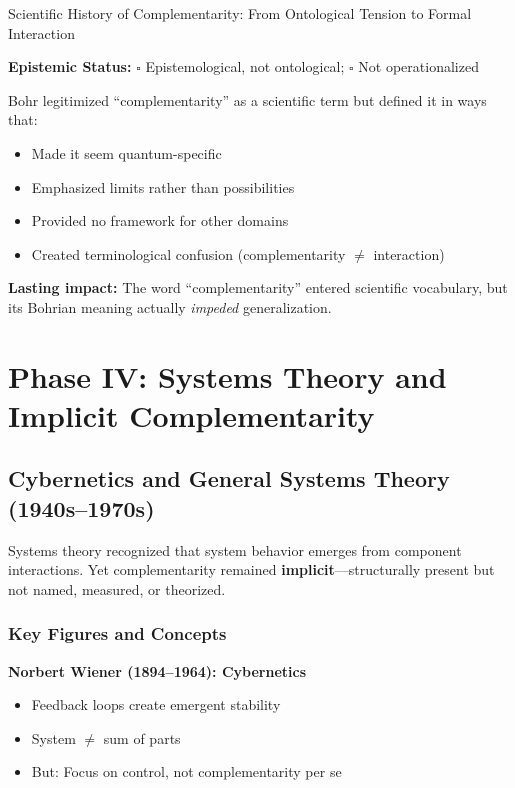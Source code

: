 \begin{chapter}{Scientific History of Complementarity: From Ontological Tension to Formal Interaction}
\begin{tcolorbox}[colback=yellow!5!white,colframe=yellow!75!black,title=\textbf{Phase III Verdict}]
\textbf{Epistemic Status:} $\square$ Epistemological, not ontological; $\square$ Not operationalized

Bohr legitimized ``complementarity'' as a scientific term but defined it in ways that:
\begin{itemize}[noitemsep]
    \item Made it seem quantum-specific
    \item Emphasized limits rather than possibilities
    \item Provided no framework for other domains
    \item Created terminological confusion (complementarity $\neq$ interaction)
\end{itemize}

\textbf{Lasting impact:} The word ``complementarity'' entered scientific vocabulary, but its Bohrian meaning actually \textit{impeded} generalization.
\end{tcolorbox}

\section{Phase IV: Systems Theory and Implicit Complementarity}
\label{sec:phase-iv}

\subsection{Cybernetics and General Systems Theory (1940s--1970s)}

\begin{tcolorbox}[colback=blue!5!white,colframe=blue!75!black,title=\textbf{Structural Presence, Conceptual Absence}]
Systems theory recognized that system behavior emerges from component interactions. Yet complementarity remained \textbf{implicit}---structurally present but not named, measured, or theorized.
\end{tcolorbox}

\subsubsection{Key Figures and Concepts}

\textbf{Norbert Wiener (1894--1964): Cybernetics}
\begin{itemize}[noitemsep]
    \item Feedback loops create emergent stability
    \item System $\neq$ sum of parts
    \item But: Focus on control, not complementarity per se
\end{itemize}


\end{chapter}

